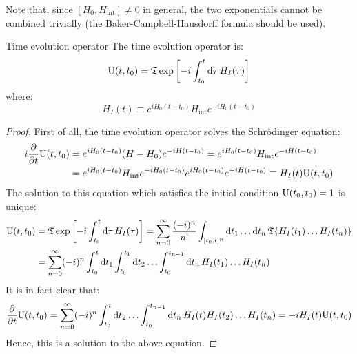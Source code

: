 Note that, since $ [H_0,H_\text{int}] \neq 0 $ in general, the two exponentials cannot be combined trivially (the Baker-Campbell-Hausdorff formula should be used).

\begin{proposition}{Time evolution operator}{}
  The time evolution operator is:
  \begin{equation}
    \mathrm{U}(t,t_0) = \mathfrak{T} \exp \left[ -i \int_{t_0}^t \mathrm{d}\tau\, H_I(\tau) \right]
  \end{equation}
  where:
  \begin{equation}
    H_I(t) \equiv e^{i H_0 (t-t_0)} H_\text{int} e^{-i H_0 (t-t_0)}
  \end{equation}
\end{proposition}

\begin{proofbox}
  \begin{proof}
    First of all, the time evolution operator solves the Schrödinger equation:
    \begin{equation*}
      \begin{split}
        i \frac{\partial}{\partial t} \mathrm{U}(t,t_0)
        & = e^{i H_0 (t-t_0)} (H - H_0) e^{-i H (t-t_0)} = e^{i H_0 (t-t_0)} H_\text{int} e^{-i H (t-t_0)} \\
        & = e^{i H_0 (t-t_0)} H_\text{int} e^{-i H_0 (t-t_0)} e^{i H_0 (t-t_0)} e^{-i H (t-t_0)} \equiv H_I(t) \mathrm{U}(t,t_0)
      \end{split}
    \end{equation*}
    The solution to this equation which satisfies the initial condition $ \mathrm{U}(t_0,t_0) = 1 $ is unique:
    \begin{equation*}
      \begin{split}
        \mathrm{U}(t,t_0)
        & = \mathfrak{T} \exp \left[ -i \int_{t_0}^t \mathrm{d}\tau\, H_I(\tau) \right] = \sum_{n = 0}^{\infty} \frac{(-i)^n}{n!} \int_{[t_0,t]^n} \mathrm{d} t_1 \dots \mathrm{d} t_n\, \mathfrak{T}\{H_I(t_1) \dots H_I(t_n)\} \\
        & = \sum_{n = 0}^{\infty} (-i)^n \int_{t_0}^t \mathrm{d} t_1 \int_{t_0}^{t_1} \mathrm{d} t_2 \dots \int_{t_0}^{t_{n-1}} \mathrm{d} t_n\, H_I(t_1) \dots H_I(t_n)
      \end{split}
    \end{equation*}
    It is in fact clear that:
    \begin{equation*}
      \frac{\partial}{\partial t} \mathrm{U}(t,t_0) = \sum_{n = 0}^{\infty} (-i)^n \int_{t_0}^{t} \mathrm{d} t_2 \dots \int_{t_0}^{t_{n-1}} \mathrm{d} t_n\, H_I(t) H_I(t_2) \dots H_I(t_n) = -i H_I(t) \mathrm{U}(t,t_0)
    \end{equation*}
    Hence, this is a solution to the above equation.
  \end{proof}
\end{proofbox}

